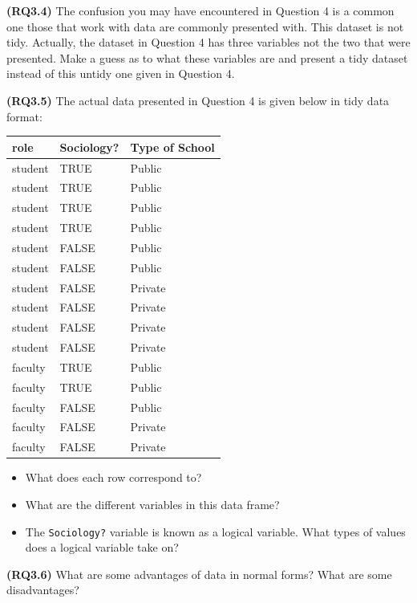 \documentclass[]{tufte-book}
\providecommand{\tightlist}{%
  \setlength{\itemsep}{0pt}\setlength{\parskip}{0pt}}
\begin{document}
\textbf{(RQ3.4)} The confusion you may have encountered in Question 4 is
a common one those that work with data are commonly presented with. This
dataset is not tidy. Actually, the dataset in Question 4 has three
variables not the two that were presented. Make a guess as to what these
variables are and present a tidy dataset instead of this untidy one
given in Question 4.

\textbf{(RQ3.5)} The actual data presented in Question 4 is given below
in tidy data format:

\begin{tabular}{l|l|l}
\hline
role & Sociology? & Type of School\\
\hline
student & TRUE & Public\\
\hline
student & TRUE & Public\\
\hline
student & TRUE & Public\\
\hline
student & TRUE & Public\\
\hline
student & FALSE & Public\\
\hline
student & FALSE & Public\\
\hline
student & FALSE & Private\\
\hline
student & FALSE & Private\\
\hline
student & FALSE & Private\\
\hline
student & FALSE & Private\\
\hline
faculty & TRUE & Public\\
\hline
faculty & TRUE & Public\\
\hline
faculty & FALSE & Public\\
\hline
faculty & FALSE & Private\\
\hline
faculty & FALSE & Private\\
\hline
\end{tabular}

\begin{itemize}
\tightlist
\item
  What does each row correspond to?\\
\item
  What are the different variables in this data frame?\\
\item
  The \texttt{Sociology?} variable is known as a logical variable. What
  types of values does a logical variable take on?
\end{itemize}

\textbf{(RQ3.6)} What are some advantages of data in normal forms? What
are some disadvantages?
\end{document}
